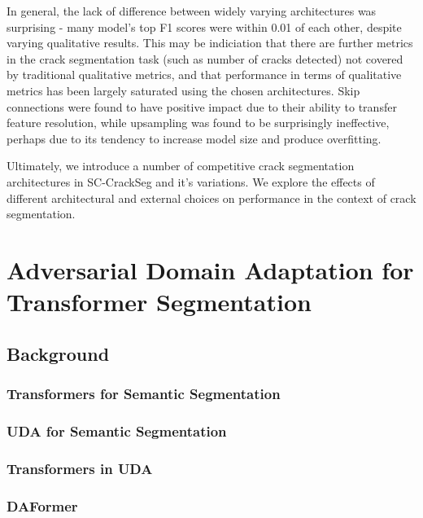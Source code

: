 \documentclass[a4paper,12pt]{report}
\begin{document}
In general, the lack of difference between widely varying architectures was surprising - many model's top F1 scores were within 0.01 of each other, despite varying qualitative results. This may be indiciation that there are further metrics in the crack segmentation task (such as number of cracks detected) not covered by traditional qualitative metrics, and that performance in terms of qualitative metrics has been largely saturated using the chosen architectures. Skip connections were found to have positive impact due to their ability to transfer feature resolution, while upsampling was found to be surprisingly ineffective, perhaps due to its tendency to increase model size and produce overfitting.

Ultimately, we introduce a number of competitive crack segmentation architectures in SC-CrackSeg and it's variations. We explore the effects of different architectural and external choices on performance in the context of crack segmentation.

\chapter{Adversarial Domain Adaptation for Transformer Segmentation}

\section{Background}

\subsection*{Transformers for Semantic Segmentation}

\subsection*{UDA for Semantic Segmentation}

\subsection*{Transformers in UDA}

\subsection*{DAFormer}
\end{document}
